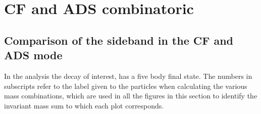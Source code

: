 \chapter{\label{sec:app:combinatoric}CF and ADS combinatoric}

\minitoc

\section{Comparison of the sideband in the CF and ADS mode}

In the analysis the decay of interest,  has a five body final state. The numbers in subscripts refer to the label given to the particles when calculating the various mass combinations, which are used in all the figures in this section to identify the invariant mass sum to which each plot corresponds. 

%
%
%




